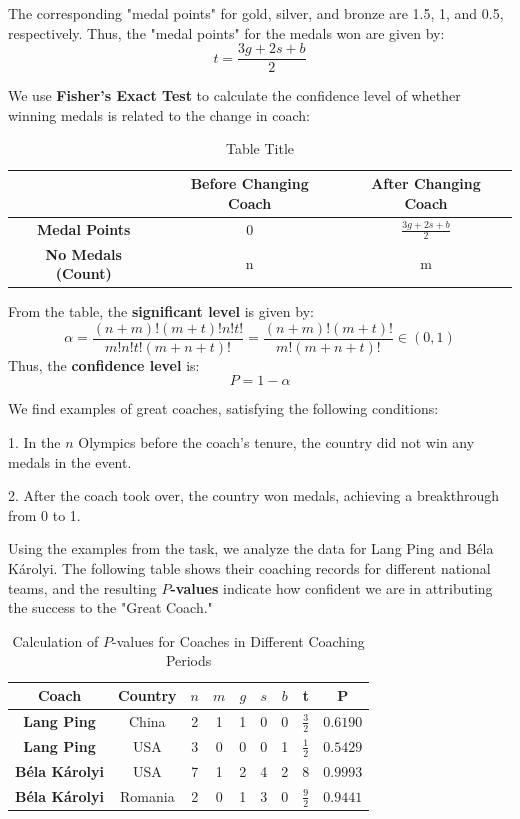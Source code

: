 \documentclass{mcmthesis}  %
\begin{document}
The corresponding "medal points" for gold, silver, and bronze are 1.5, 1, and 0.5, respectively. Thus, the "medal points" for the medals won are given by:
$$ t = \frac{3g + 2s + b}{2} $$

We use \textbf{Fisher's Exact Test} to calculate the confidence level of whether winning medals is related to the change in coach:

\begin{table}[h]
\centering
\begin{tabular}{|c|c|c|}
\hline
\textbf & {Before Changing Coach} & \textbf{After Changing Coach} \\
\hline
\textbf{Medal Points} & 0 & $\displaystyle \frac{3g+2s+b}{2}$ \\
\hline
\textbf{No Medals (Count)} & n & m \\
\hline
\end{tabular}
\caption{Table Title}
\end{table}

From the table, the \textbf{significant level} is given by:
$$
\alpha = \frac{(n+m)!(m+t)!n!t!}{m!n!t!(m+n+t)!} = \frac{(n+m)!(m+t)!}{m!(m+n+t)!} \in (0,1)
$$
Thus, the \textbf{confidence level} is:
$$
P = 1 - \alpha
$$

We find examples of great coaches, satisfying the following conditions:

1. In the \(n\) Olympics before the coach’s tenure, the country did not win any medals in the event.

2. After the coach took over, the country won medals, achieving a breakthrough from 0 to 1.

Using the examples from the task, we analyze the data for Lang Ping and Béla Károlyi. The following table shows their coaching records for different national teams, and the resulting\textbf{ \(P\)-values} indicate how confident we are in attributing the success to the "Great Coach."

\begin{table}[h!]
\centering
\begin{tabular}{|c|c|c|c|c|c|c|c|c|}
\hline
\textbf{Coach} & \textbf{Country} & \( n \) & \( m \) & \( g \) & \( s \) & \( b \) & t & P \\ \hline
\textbf{Lang Ping} & China & 2 & 1 & 1 & 0 & 0 & \( \frac{3}{2} \) & \( 0.6190 \) \\ \hline
\textbf{Lang Ping} & USA & 3 & 0 & 0 & 0 & 1 & \( \frac{1}{2} \) & \( 0.5429 \) \\ \hline
\textbf{Béla Károlyi} & USA & 7 & 1 & 2 & 4 & 2 & \( 8 \) & \( 0.9993 \) \\ \hline
\textbf{Béla Károlyi} & Romania & 2 & 0 & 1 & 3 & 0 & \( \frac{9}{2} \) & \( 0.9441 \) \\ \hline
\end{tabular}
\caption{Calculation of \( P \)-values for Coaches in Different Coaching Periods}
\end{table}
\end{document}
